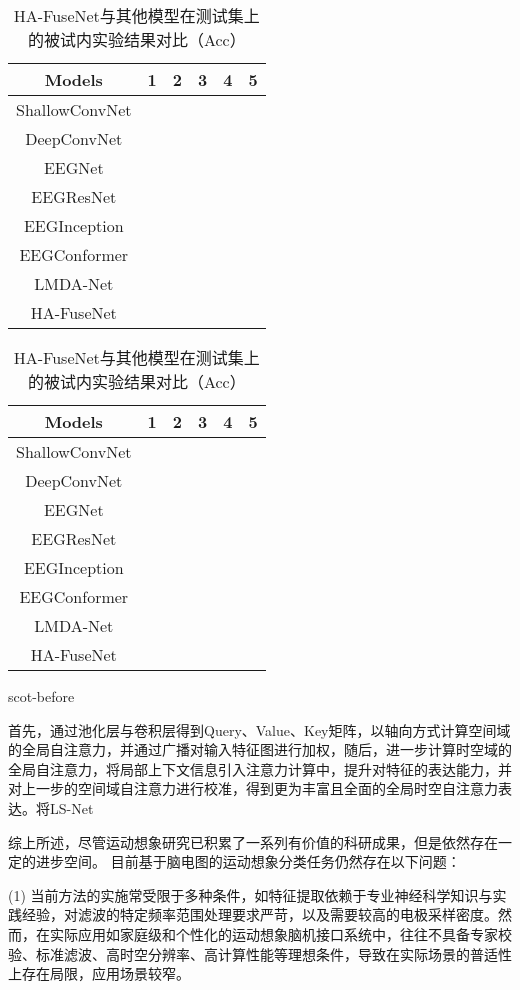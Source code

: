 \begin{table}[ht]
  \centering
  \caption{HA-FuseNet与其他模型在测试集上的被试内实验结果对比（Acc）}
  \label{tab:2acomparecross}
  \begin{tabularx}{\textwidth}{CCCCCC}
    \toprule
    Models & 1 & 2 & 3 & 4 & 5\\
    \midrule
    ShallowConvNet \\
    DeepConvNet \\
    EEGNet \\
    EEGResNet \\
    EEGInception \\
    EEGConformer \\
    LMDA-Net \\
    \midrule 
    HA-FuseNet \\
    \bottomrule
  \end{tabularx}
\end{table}
\begin{table}[ht]
  \centering
  \caption{HA-FuseNet与其他模型在测试集上的被试内实验结果对比（Acc）}
  \label{tab:2acomparecross1}
  \begin{tabularx}{\textwidth}{CCCCCC}
    \toprule
    Models & 1 & 2 & 3 & 4 & 5\\
    \midrule
    ShallowConvNet \\
    DeepConvNet \\
    EEGNet \\
    EEGResNet \\
    EEGInception \\
    EEGConformer \\
    LMDA-Net \\
    \midrule 
    HA-FuseNet \\
    \bottomrule
  \end{tabularx}
\end{table}


scot-before

首先，通过池化层与卷积层得到Query、Value、Key矩阵，以轴向方式计算空间域的全局自注意力，并通过广播对输入特征图进行加权，随后，进一步计算时空域的全局自注意力，将局部上下文信息引入注意力计算中，提升对特征的表达能力，并对上一步的空间域自注意力进行校准，得到更为丰富且全面的全局时空自注意力表达。将LS-Net


综上所述，尽管运动想象研究已积累了一系列有价值的科研成果，但是依然存在一定的进步空间。
目前基于脑电图的运动想象分类任务仍然存在以下问题：

(1) 当前方法的实施常受限于多种条件，如特征提取依赖于专业神经科学知识与实践经验，对滤波的特定频率范围处理要求严苛，以及需要较高的电极采样密度。然而，在实际应用如家庭级和个性化的运动想象脑机接口系统中，往往不具备专家校验、标准滤波、高时空分辨率、高计算性能等理想条件，导致在实际场景的普适性上存在局限，应用场景较窄。

